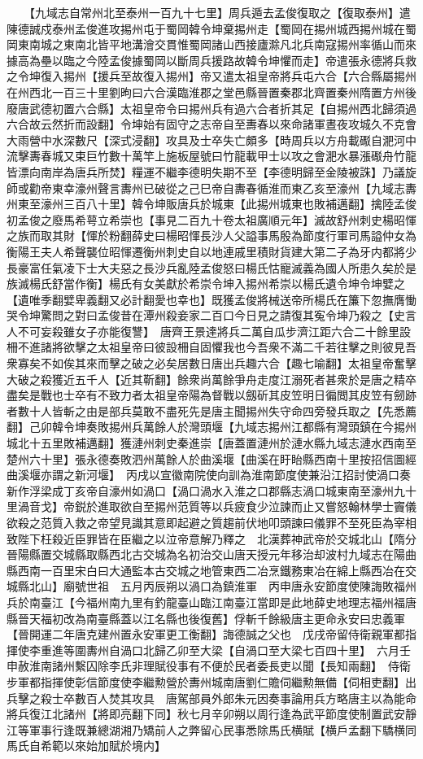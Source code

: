 　　【九域志自常州北至泰州一百九十七里】周兵遁去孟俊復取之【復取泰州】遣陳德誠戍泰州孟俊進攻掦州屯于蜀岡韓令坤棄掦州走【蜀岡在掦州城西掦州城在蜀岡東南城之東南北皆平地溝澮交貫惟蜀岡諸山西接廬滁凡北兵南寇掦州率循山而來據高為壘以臨之今陸孟俊據蜀岡以斷周兵援路故韓令坤懼而走】帝遣張永德將兵救之令坤復入掦州【援兵至故復入掦州】帝又遣太祖皇帝將兵屯六合【六合縣屬掦州在州西北一百三十里劉昫曰六合漢臨淮郡之堂邑縣晉置秦郡北齊置秦州隋置方州後廢唐武德初置六合縣】太祖皇帝令曰掦州兵有過六合者折其足【自掦州西北歸須過六合故云然折而設翻】令坤始有固守之志帝自至夀春以來命諸軍晝夜攻城久不克會大雨營中水深數尺【深式浸翻】攻具及士卒失亡頗多【時周兵以方舟載礟自淝河中流擊夀春城又束巨竹數十萬竿上施板屋號曰竹龍載甲士以攻之會淝水暴漲礟舟竹龍皆漂向南岸為唐兵所焚】糧運不繼李德明失期不至【李德明歸至金陵被誅】乃議旋師或勸帝東幸濠州聲言夀州已破從之己巳帝自夀春循淮而東乙亥至濠州【九域志夀州東至濠州三百八十里】韓令坤販唐兵於城東【此掦州城東也敗補邁翻】擒陸孟俊初孟俊之廢馬希萼立希崇也【事見二百九十卷太祖廣順元年】滅故舒州刺史楊昭惲之族而取其財【惲於粉翻薛史曰楊昭惲長沙人父謚事馬殷為節度行軍司馬謚仲女為衡陽王夫人希聲襲位昭惲遷衡州刺史自以地連戚里積財貨建大第二子為牙内都將少長豪富任氣凌下士大夫惡之長沙兵亂陸孟俊怒曰楊氏怙寵滅義為國人所患久矣於是族滅楊氏舒當作衡】楊氏有女美獻於希崇令坤入掦州希崇以楊氏遺令坤令坤嬖之【遺唯季翻嬖卑義翻又必計翻愛也幸也】既獲孟俊將械送帝所楊氏在簾下忽撫膺慟哭令坤驚問之對曰孟俊昔在潭州殺妾家二百口今日見之請復其寃令坤乃殺之【史言人不可妄殺雖女子亦能復讐】　唐齊王景達將兵二萬自瓜步濟江距六合二十餘里設柵不進諸將欲擊之太祖皇帝曰彼設柵自固懼我也今吾衆不滿二千若往擊之則彼見吾衆寡矣不如俟其來而擊之破之必矣居數日唐出兵趣六合【趣七喻翻】太祖皇帝奮擊大破之殺獲近五千人【近其靳翻】餘衆尚萬餘爭舟走度江溺死者甚衆於是唐之精卒盡矣是戰也士卒有不致力者太祖皇帝陽為督戰以劔斫其皮笠明日徧閲其皮笠有劒跡者數十人皆斬之由是部兵莫敢不盡死先是唐主聞掦州失守命四旁發兵取之【先悉薦翻】己卯韓令坤奏敗掦州兵萬餘人於灣頭堰【九域志掦州江都縣有灣頭鎮在今掦州城北十五里敗補邁翻】獲漣州刺史秦進崇【唐蓋置漣州於漣水縣九域志漣水西南至楚州六十里】張永德奏敗泗州萬餘人於曲溪堰【曲溪在盱眙縣西南十里按招信圖經曲溪堰亦謂之新河堰】　丙戌以宣徽南院使向訓為淮南節度使兼沿江招討使渦口奏新作浮梁成丁亥帝自濠州如渦口【渦口渦水入淮之口郡縣志渦口城東南至濠州九十里渦音戈】帝鋭於進取欲自至掦州范質等以兵疲食少泣諫而止又嘗怒翰林學士竇儀欲殺之范質入救之帝望見識其意即起避之質趨前伏地叩頭諫曰儀罪不至死臣為宰相致陛下枉殺近臣罪皆在臣繼之以泣帝意解乃釋之　北漢葬神武帝於交城北山【隋分晉陽縣置交城縣取縣西北古交城為名初治交山唐天授元年移治却波村九域志在陽曲縣西南一百里宋白曰大通監本古交城之地管東西二冶烹鐵務東冶在綿上縣西冶在交城縣北山】廟號世祖　五月丙辰朔以渦口為鎮淮軍　丙申唐永安節度使陳誨敗福州兵於南臺江【今福州南九里有釣龍臺山臨江南臺江當即是此地薛史地理志福州福唐縣晉天福初改為南臺縣蓋以江名縣也後復舊】俘斬千餘級唐主更命永安曰忠義軍【晉開運二年唐克建州置永安軍更工衡翻】誨德誠之父也　戊戌帝留侍衛親軍都指揮使李重進等圍夀州自渦口北歸乙卯至大梁【自渦口至大梁七百四十里】　六月壬申赦淮南諸州繫囚除李氏非理賦役事有不便於民者委長吏以聞【長知兩翻】　侍衛步軍都指揮使彰信節度使李繼勲營於夀州城南唐劉仁贍伺繼勲無備【伺相吏翻】出兵擊之殺士卒數百人焚其攻具　唐駕部員外郎朱元因奏事論用兵方略唐主以為能命將兵復江北諸州【將即亮翻下同】秋七月辛卯朔以周行逢為武平節度使制置武安靜江等軍事行逢既兼總湖湘乃矯前人之弊留心民事悉除馬氏横賦【横戶孟翻下驕横同馬氏自希範以來始加賦於境内】